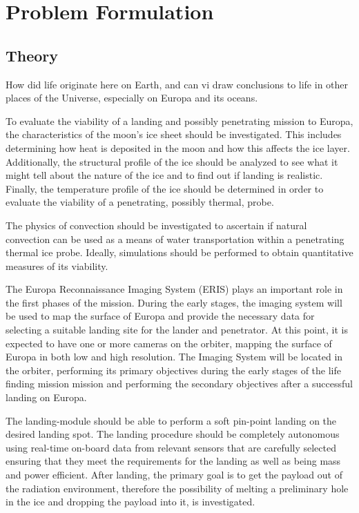 \chapter{Problem Formulation}

\section{Theory}
How did life originate here on Earth, and can vi draw conclusions to life in other places of the Universe, especially on Europa and its oceans.

To evaluate the viability of a landing and possibly penetrating mission to Europa, the characteristics of the moon's ice sheet should be investigated. This includes determining how heat is deposited in the moon and how this affects the ice layer. Additionally, the structural profile of the ice should be analyzed to see what it might tell about the nature of the ice and to find out if landing is realistic. Finally, the temperature profile of the ice should be determined in order to evaluate the viability of a penetrating, possibly thermal, probe.

The physics of convection should be investigated to ascertain if natural convection can be used as a means of water transportation within a penetrating thermal ice probe. Ideally, simulations should be performed to obtain quantitative measures of its viability.



The Europa Reconnaissance Imaging System (ERIS) plays an important role in the first phases of the mission. During the early stages, the imaging system will be used to map the surface of Europa and provide the necessary data for selecting a suitable landing site for the lander and penetrator. At this point, it is expected to have one or more cameras on the orbiter, mapping the surface of Europa in both low and high resolution. The Imaging System will be located in the orbiter, performing its primary objectives during the early stages of the life finding mission mission and performing the secondary objectives after a successful landing on Europa.

The landing-module should be able to perform a soft pin-point landing on the desired landing spot. The landing procedure should be completely autonomous using real-time on-board data from relevant sensors that are carefully selected ensuring that they meet the requirements for the landing as well as being mass and power efficient. After landing, the primary goal is to get the payload out of the radiation environment, therefore the possibility of melting a preliminary hole in the ice and dropping the payload into it, is investigated.

